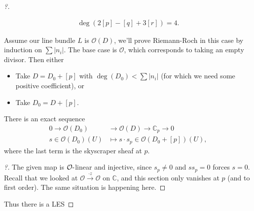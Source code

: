 \begin{proof}[?]
\begin{example}[?]

\begin{align*}
\deg( 2[p] -[q] + 3[r]) = 4
.\end{align*}

\end{example}

\begin{remark}

Assume our line bundle \(L\) is \({\mathcal{O}}(D)\), we'll prove
Riemann-Roch in this case by induction on
\(\sum {\left\lvert {n_i} \right\rvert}\). The base case is
\({\mathcal{O}}\), which corresponds to taking an empty divisor. Then
either

\begin{itemize}
\tightlist
\item
  Take \(D = D_0 + [p]\) with
  \(\deg(D_0) < \sum {\left\lvert {n_i} \right\rvert}\) (for which we
  need some positive coefficient), or
\item
  Take \(D_0 = D + [p]\).
\end{itemize}

\end{remark}

\begin{claim}

There is an exact sequence
\begin{align*}
0 \to {\mathcal{O}}(D_0) &\to {\mathcal{O}}(D) \to {\mathbb{C}}_p \to 0\\
s\in {\mathcal{O}}(D_0)(U) &\mapsto s \cdot s_p \in {\mathcal{O}}( D_0 + [p] ) (U)
,\end{align*}
where the last term is the skyscraper sheaf at \(p\).

\end{claim}

\begin{proof}[?]

The given map is \({\mathcal{O}}{\hbox{-}}\)linear and injective, since
\(s_p\neq 0\) and \(s s_p=0\) forces \(s=0\). Recall that we looked at
\({\mathcal{O}}\xrightarrow{\cdot z} {\mathcal{O}}\) on
\({\mathbb{C}}\), and this section only vanishes at \(p\) (and to first
order). The same situation is happening here.

\end{proof}

Thus there is a LES


\end{proof}
